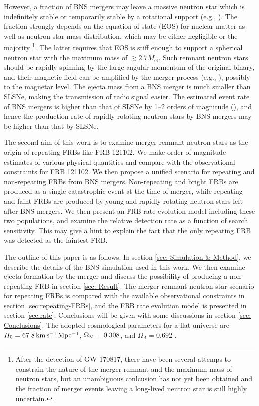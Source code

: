 \documentclass[]{pasj01}
\begin{document}
However, a fraction of BNS mergers may leave a massive neutron star
which is indefinitely stable or temporarily stable by a rotational
support (e.g., \cite{Gao2013,Metzger&Piro2014,Piro2017}).  The
fraction strongly depends on the equation of state (EOS) for nuclear
matter as well as neutron star mass distribution, 
which may be either negligible or the
majority \footnote{
After the detection of GW 170817, there have been
several attemps to constrain the nature of the
merger remnant and the maximum mass of neutron stars,
but an unambiguous conlcusion has not yet been obtained
and the fraction of merger events leaving a long-lived
neutron star is still highly uncertain. }.  The
latter requires that EOS is stiff enough to support a spherical
neutron star with the maximum mass of $\gtrsim 2.7 M_\odot$.  Such
remnant neutron stars should be rapidly spinning by the large angular
momentum of the original binary, and their magnetic field can be
amplified by the merger process (e.g., \cite{Kiuchi2014}), possibly to
the magnetar level. The ejecta mass from a BNS merger is much smaller
than SLSNe, making the transmission of radio signal easier.  The
estimated event rate of BNS mergers is higher than that of SLSNe by
1--2 orders of magnitude (\cite{Abadie2010,Quimby2013}), and hence the
production rate of rapidly rotating neutron stars by BNS mergers may
be higher than that by SLSNe.

The second aim of this work is to examine merger-remnant neutron stars
as the origin of repeating FRBs like FRB 121102.  We make
order-of-magnitude estimates of various physical quantities and
compare with the observational constraints for FRB 121102. We then
propose a unified scenario for repeating and non-repeating FRBs from
BNS mergers. Non-repeating and bright FRBs are produced as a single
catastrophic event at the time of merger, while repeating and faint
FRBs are produced by young and rapidly rotating neutron stars left after BNS
mergers.  We then present an FRB rate evolution model including these
two populations, and examine the relative detection rate as a
function of search sensitivity. This may give a hint to explain the
fact that the only repeating FRB was detected as the faintest FRB.

The outline of this paper is as follows.  In section \ref{sec:
  Simulation & Method}, we describe the details of the BNS simulation
used in this work.  We then examine ejecta formation by the merger and
discuss the possibility of producing a non-repeating FRB in section
\ref{sec: Result}. The merger-remnant neutron star scenario for
repeating FRBs is compared with the available observational
constraints in section \ref{sec:repeating-FRBs}, and the FRB rate
evolution model is presented in section \ref{sec:rate}.
Conclusions will be given with some discussions in section \ref{sec:
  Conclusions}. The adopted cosmological parameters for a flat universe
are $H_0 = 67.8\,{\rm km\, s^{-1}\,Mpc^{-1}}$, 
$\Omega_{\rm M} = 0.308$, and 
$\Omega_{\Lambda}= 0.692$ \citep{Planck2016}.
\end{document}
